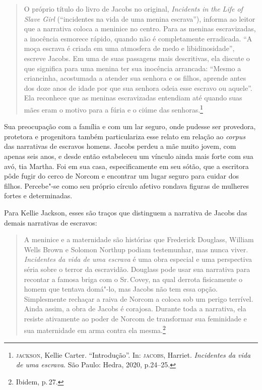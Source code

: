 \begin{quote}
O próprio título do
livro de Jacobs no original, \emph{Incidents in the Life of Slave Girl}
(``incidentes na vida de uma menina escrava''), informa ao leitor que a
narrativa coloca a meninice no centro. Para as meninas escravizadas, a
inocência esmorece rápido, quando não é completamente erradicada. ``A
moça escrava é criada em uma atmosfera de medo e libidinosidade'',
escreve Jacobs. Em uma de suas passagens mais descritivas, ela discute o
que significa para uma menina ter sua inocência arrancada: ``Mesmo a
criancinha, acostumada a atender
sua senhora e os filhos, aprende antes dos doze anos de idade por que
sua senhora odeia esse escravo ou aquele''. Ela reconhece que as meninas
escravizadas entendiam até quando suas mães eram o motivo para a fúria e
o ciúme das senhoras.\footnote{\textsc{jackson}, Kellie Carter. ``Introdução''. In: \textsc{jacobs}, Harriet. \textit{Incidentes da vida de uma escrava}. São Paulo: Hedra, 2020, p.24--25.}
\end{quote}

Sua preocupação com a família e com um lar seguro, onde pudesse ser provedora, protetora e progenitora também particulariza esse relato em relação ao \textit{corpus} das narrativas de escravos homens. Jacobs perdeu a mãe muito jovem, com apenas seis anos, e desde então estabeleceu um vínculo ainda mais forte com sua avó, tia Martha. Foi em sua casa, especificamente em seu sótão, que a escritora pôde fugir do cerco de Norcom e encontrar um lugar seguro para cuidar dos filhos. Percebe"-se como seu próprio círculo afetivo rondava figuras de mulheres fortes e determinadas.

Para Kellie Jackson, esses são traços que distinguem a narrativa de Jacobs das demais narrativas de escravos:

\begin{quote}
A meninice e a maternidade são histórias que Frederick Douglass, William
Wells Brown e Solomon Northup podiam testemunhar, mas nunca viver.
\emph{Incidentes da vida de uma escrava} é uma obra especial e uma
perspectiva séria sobre o terror da escravidão. Douglass pode usar sua
narrativa para recontar a famosa briga com o Sr.\,Covey, na qual derrota
fisicamente o homem que tentava domá"-lo, mas Jacobs não tem essa opção.
Simplesmente rechaçar a raiva de Norcom a coloca sob um perigo terrível.
Ainda assim, a obra de Jacobs é corajosa. Durante toda a narrativa, ela
resiste ativamente ao poder de Norcom de transformar sua feminidade e
sua maternidade em arma contra ela mesma.\footnote{Ibidem, p.\,27.}
\end{quote}

